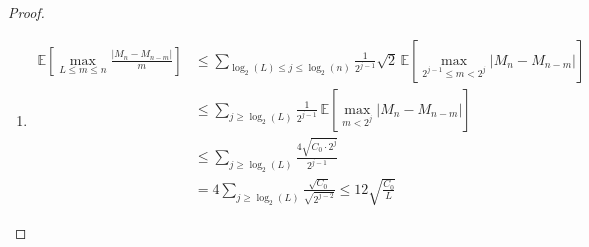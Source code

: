 \documentclass[11pt]{article}
\theoremstyle{plain}
\theoremstyle{definition}
\begin{document}
\begin{appendix}
\begin{proof}
\begin{enumerate}[label=(\roman*)]
		Define now the new forward filtration \(\mathcal{G}_k := \mathcal{F}_{n-L+k}\). 
		We have 
		\begin{align*}
			\mathbb{E}[S_k \mid \mathcal{G}_{k-1}] 
			&= S_{k-1} + \mathbb{E}[\Delta S_k\mid \mathcal{G}_{k-1}]\\
			&= S_{k-1} + \mathbb{E}[M_{n-L+k} - M_{n-L+k-1} \mid \mathcal{G}_{k-1}]\\
			&= S_{k-1}
		\end{align*}
		so \(\{S_k\}\) is a \(\mathcal{G}_k\)-martingale. Then \(\{S_k^2\}\) is a sub-martingale. Applying Doob's maximal inequality (see Corollary 2.1.6 in \cite{marc-yor}), we obtain
		\begin{align}
			\mathbb{P}\!\left( \sup_{k \in \{1,\dots,L\}} S_k^2 \ge x^2 \right)
			&\le \frac{\mathbb{E}[S_L^2]}{x^2}\notag\\
			\implies \mathbb{P}\!\left( \sup_{k \in \{1,\dots,L\}} |S_k| \ge x \right)
			&\le \frac{\mathbb{E}[S_L^2]}{x^2}\label{eq:doob-1}
		\end{align}
		\(\{S_k\}\) being a martingale gives that \(\{\Delta S_k\}\) are orthogonal,  
		i.e. \(\operatorname{Cov}(\Delta S_k, \Delta S_j)=0\). So:
		\begin{align*}
			\mathbb{E}[S_L^2]
			&= \sum_{k=1}^L \mathbb{E}[\,|\Delta S_k|^2\,]\\
			&= \sum_{k=1}^L \mathbb{E}\!\left[\,|\Delta M_{n-L+k}|^2\,\right]\le L C_0.		
		\end{align*}	
		So from \eqref{eq:doob-2} and \eqref{eq:doob-1} we obtain 
		\[
		\mathbb{P}\!\left( \sup_{m \in \{1,\dots,L\}} |M_n - M_{n-m}| \ge x \right)
		\le 4\frac{LC_0}{x^2}
		\]	
		Then
		\begin{align*}
			\mathbb{E}\left[\sup_{m \in \{1,\dots,L\}} |M_n - M_{n-m}|\right] &= \int_{0}^{+\infty}\mathbb{P}\!\left( \sup_{m \in \{1,\dots,L\}} |M_n - M_{n-m}| \ge x \right) dx\\
			&\leq \int_{0}^{2\sqrt{LC_0}}1 \dot dx + 4\int_{2\sqrt{LC_0}}^{+\infty}\frac{LC_0}{x^2} \dot dx = 4\sqrt{LC_0}
		\end{align*}
		
		\item \begin{align*}
			\mathbb{E} \left[ \max_{L \leq m \leq n} \frac{|M_n - M_{n - m}|}{m} \right]
			&\leq \sum_{\log_2(L) \leq j \leq \log_2(n)} 
			\frac{1}{2^{j - 1}} \sqrt{2} \, \mathbb{E} \left[ 
			\max_{2^{j - 1} \leq m < 2^j} |M_n - M_{n - m}| \right] \\
			&\leq \sum_{j \geq \log_2(L)} 
			\frac{1}{2^{j - 1}} \, \mathbb{E} \left[ 
			\max_{m < 2^j} |M_n - M_{n - m}| \right] \\
			&\leq \sum_{j \geq \log_2(L)} 
			\frac{4\sqrt{C_0 \cdot 2^j}}{2^{j - 1}} \\
			&= 4\sum_{j \geq \log_2(L)} \frac{\sqrt{C_0}}{\sqrt{2^{j - 2}}}
			\leq 12 \sqrt{\frac{C_0}{L}}	
		\end{align*}
	\end{enumerate}
	

\end{proof}
\end{appendix}
\end{document}
